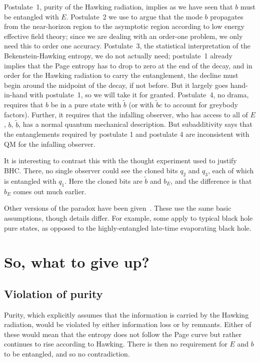 \documentclass[12pt]{article}
\newcommand{\sect}[1]{\section{#1}\setcounter{equation}{0}}
\begin{document}
Postulate~1, purity of the Hawking radiation, implies as we have seen that $b$ must be entangled with $E$.  Postulate~2 we use to argue that the mode $b$ propagates from the near-horizon region to the asymptotic region according to low energy effective field theory; since we are dealing with an order-one problem, we only need this to order one accuracy.  Postulate~3, the statistical interpretation of the Bekenstein-Hawking entropy, we do not actually need; postulate~1 already implies that the Page entropy has to drop to zero at the end of the decay, and in order for the Hawking radiation to carry the entanglement, the decline must begin around the midpoint of the decay, if not before.  But it largely goes hand-in-hand with postulate~1, so we will take it for granted.  Postulate~4, no drama, requires that $b$ be in a pure state with $\tilde b$ (or with $\tilde b c$ to account for greybody factors).  Further, it requires that the infalling observer, who has access to all of $E$, $b$, $\tilde b$, has a normal quantum mechanical description.  But subadditivity says that the entanglements required by postulate 1 and postulate 4 are inconsistent with QM for the infalling observer. 

It is interesting to contrast this with the thought experiment used to justify BHC.  There, no single observer could see the cloned bits $q_2$ and $q_3$, each of which is entangled with $q_1$.  Here the cloned bits are $\tilde b$ and $b_E$, and the difference is that $b_E$ comes out much earlier.

Other versions of the paradox have been given~\cite{Almheiri:2013hfa,Bousso:2013wia,Marolf:2013dba}.  These use the same basic assumptions, though details differ.  For example, some apply to typical black hole pure states, as opposed to the highly-entangled late-time evaporating black hole.


\sect{So, what to give up?}

\subsection{Violation of purity}

Purity, which explicitly assumes that the information is carried by the Hawking radiation, would be violated by either information loss or by remnants.  Either of these would mean that the entropy does not follow the Page curve but rather continues to rise according to Hawking.  There is then no requirement for $E$ and $b$ to be entangled, and so no contradiction.
\end{document}

